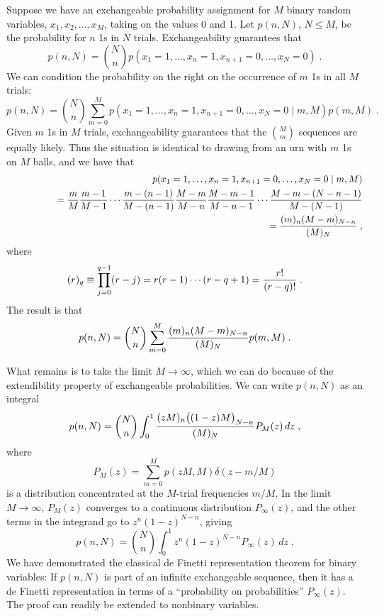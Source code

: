Suppose we have an exchangeable probability assignment for $M$ binary
random variables, $x_1,x_2,\ldots,x_M$, taking on the values 0 and
1.  Let $p(n,N)$, $N\le M$, be the probability for $n$ 1s in $N$
trials.  Exchangeability guarantees that
\begin{equation}
p(n,N)= {N\choose n} p(x_1=1,\ldots,x_n=1,x_{n+1}=0,\ldots,x_N=0)\;.
\end{equation}
We can condition the probability on the right on the occurrence of $m$
1s in all $M$ trials:
\begin{equation}
p(n,N)={N\choose n} \sum_{m=0}^M
p(x_1=1,\ldots,x_n=1,x_{n+1}=0,\ldots,x_N=0\mid m,M) p(m,M)\;.
\end{equation}
Given $m$ 1s in $M$ trials, exchangeability guarantees that the
$\displaystyle{{M\choose m}}$ sequences are equally likely.  Thus
the situation is identical to drawing from an urn with $m$ 1s on
$M$ balls, and we have that
\begin{eqnarray}
&& p(x_1=1,\ldots,x_n=1,x_{n+1}=0,\ldots,x_N=0\mid m,M) \nonumber
\\
&&\hphantom{p(x_1=1,}{}= {m\over M} {m-1\over M-1} \cdots {m-(n-1)\over
M-(n-1)} {M-m\over M-n} {M-m-1\over M-n-1} \cdots {M-m-(N-n-1)\over
M-(N-1)} \nonumber \\
&&\hphantom{p(x_1=1,}{}= {(m)_n(M-m)_{N-n}\over(M)_N} \;,
\end{eqnarray}
where
\begin{equation}
(r)_q\equiv\prod_{j=0}^{q-1}(r-j)=r(r-1)\cdots(r-q+1)={r!\over(r-q)!}\;.
\end{equation}
The result is that
\begin{equation}
p(n,N)={N\choose n} \sum_{m=0}^M {(m)_n(M-m)_{N-n}\over(M)_N} p(m,M)\;.
\end{equation}

What remains is to take the limit $M\rightarrow\infty$, which we
can do because of the extendibility property of exchangeable
probabilities.  We can write $p(n,N)$ as an integral
\begin{equation}
p(n,N)={N\choose n} \int_0^1
{(zM)_n\bigl((1-z)M\bigr)_{N-n}\over(M)_N} P_M(z)\,dz\;,
\end{equation}
where
\begin{equation}
P_M(z)=
\sum_{m=0}^M p(zM,M)\delta (z-m/M)
\end{equation}
is a distribution concentrated at the $M$-trial frequencies $m/M$.
In the limit $M\rightarrow\infty$, $P_M(z)$ converges to a
continuous distribution $P_\infty(z)$, and the other terms in the
integrand go to $z^n(1-z)^{N-n}$, giving
\begin{equation}
p(n,N)={N\choose n} \int_0^1 z^n(1-z)^{N-n} P_\infty(z)\,dz \;.
\end{equation}
We have demonstrated the classical de Finetti representation
theorem for binary variables: If $p(n,N)$ is part of an infinite
exchangeable sequence, then it has a de Finetti representation in
terms of a ``probability on probabilities'' $P_\infty(z)$.  The
proof can readily be extended to nonbinary variables.

